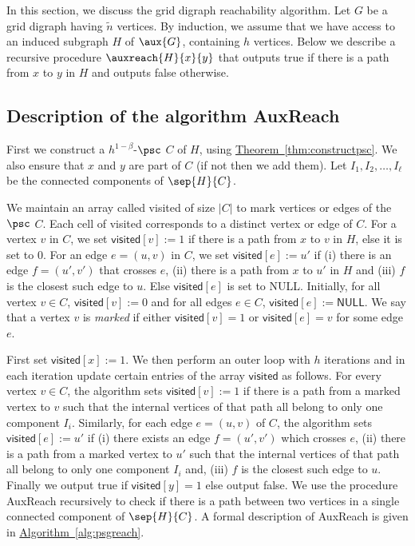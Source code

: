 \documentclass[11pt]{article}
\numberwithin{equation}{section}
\theoremstyle{definition}
\theoremstyle{plain}
\newcommand{\expref}[2]{\hyperref[#2]{#1~\ref{#2}}}
\begin{document}
In this section, we discuss the grid %
digraph %
 reachability algorithm. Let $G$ be a grid %
digraph %
 having $\widetilde{n}$ vertices. By induction, we assume that we have access to %
an %
induced subgraph $H$ of $\aux{G}$, containing $h$ vertices. Below we describe a recursive procedure $\auxreach{H}{x}{y}$ that outputs \textsf{true} if there is a path from $x$ to $y$ in $H$ and outputs \textsf{false} otherwise.

\subsection{Description of the algorithm \textsf{AuxReach}}

First we construct a $h^{1-\beta}$-$\psc$ $C$ of $H$, using \expref{Theorem}{thm:constructpsc}. We also ensure that $x$ and $y$ are part of $C$ (if not then we add them). Let $I_1, I_2, \ldots, I_{\ell}$ be the connected components of $\sep{H}{C}$.

We maintain an array called \textsf{visited} of size $|C|$ to mark vertices or edges of the $\psc$ $C$. Each cell of \textsf{visited} corresponds to a distinct vertex or edge of $C$. For a vertex $v$ in $C$, we set $\textsf{visited}[v] := 1$ if there is a path from $x$ to $v$ in $H$, else it is set to 0. For an edge $e = (u,v)$ in $C$, we set $\textsf{visited}[e] := u'$ if (i) there is an edge $f = (u',v')$ that crosses $e$, (ii) there is a path from $x$ to $u'$ in $H$ and (iii) $f$ is the closest such edge to $u$. Else $\textsf{visited}[e]$ is set to \textsf{NULL}. Initially, for all vertex $v \in C$, $\textsf{visited}[v] := 0$ and for all edges $e \in C$, $\textsf{visited}[e] := \textsf{NULL}$. We say that a vertex $v$ is \emph{marked} if either $\textsf{visited}[v] = 1$ or $\textsf{visited}[e] = v$ for some edge $e$.

First set $\textsf{visited}[x]:=1$. We then perform an outer loop with $h$ iterations and in each iteration update certain entries of the array $\textsf{visited}$ as follows. For every vertex $v \in C$, the algorithm sets $\textsf{visited}[v]:=1$ if there is a path from a marked vertex to $v$ such that the internal vertices of that path all belong to only one component $I_i$. Similarly, for each edge $e = (u,v)$ of $C$, the algorithm sets $\textsf{visited}[e]:=u'$ if (i) there exists an edge $f = (u',v')$ which crosses $e$, (ii) there is a path from a marked vertex to $u'$ such that the internal vertices of that path all belong to only one component $I_i$ and, (iii) $f$ is the closest such edge to $u$. Finally we output \textsf{true} if $\textsf{visited}[y] = 1$ else output \textsf{false}. We use the procedure \textsf{AuxReach} recursively to check if there is a path between two vertices in a single connected component of $\sep{H}{C}$. A formal description of \textsf{AuxReach} is given in \expref{Algorithm}{alg:psgreach}.
\end{document}
